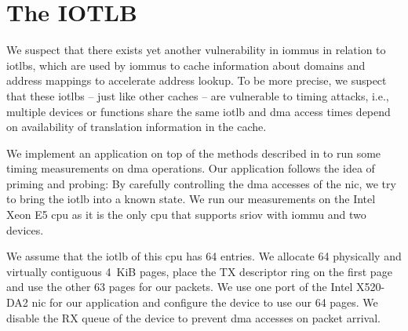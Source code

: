 \section{The IOTLB}
\label{sec:iotlb}

We suspect that there exists yet another vulnerability in \acp{iommu} in
relation to \acp{iotlb}, which are used by \acp{iommu} to cache information
about domains and address mappings to accelerate address lookup. To be more
precise, we suspect that these \acp{iotlb} -- just like other caches -- are
vulnerable to timing attacks, i.e., multiple devices or functions share the same
\ac{iotlb} and \ac{dma} access times depend on availability of translation
information in the cache.

We implement an application on top of the methods described in
 to run some timing measurements on \ac{dma} operations.
Our application follows the idea of priming and probing: By carefully
controlling the \ac{dma} accesses of the \ac{nic}, we try to bring the
\ac{iotlb} into a known state. We run our measurements on the Intel Xeon E5
\ac{cpu} as it is the only \ac{cpu} that supports \ac{sriov} with \ac{iommu} and
two devices.

We assume that the \ac{iotlb} of this \ac{cpu} has 64 entries. We allocate 64
physically and virtually contiguous 4~KiB pages, place the TX descriptor ring on
the first page and use the other 63 pages for our packets. We use one port of
the Intel X520-DA2 \ac{nic} for our application and configure the device to use
our 64 pages. We disable the RX queue of the device to prevent \ac{dma} accesses
on packet arrival.

